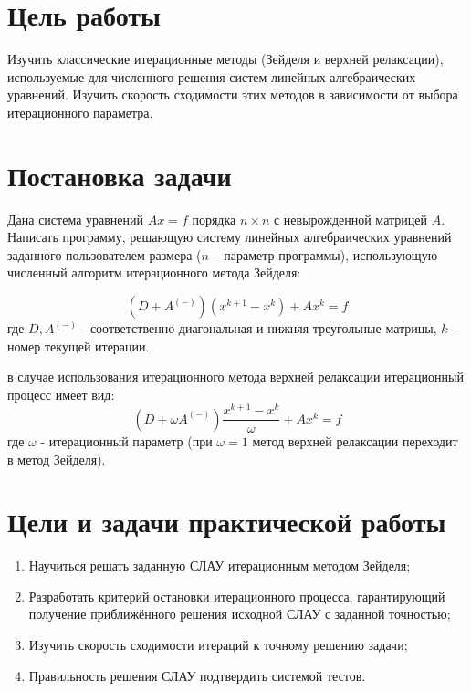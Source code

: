 \newpage
\section{Цель работы}

Изучить классические итерационные методы (Зейделя и верхней релаксации), используемые для численного решения систем линейных алгебраических уравнений.
Изучить скорость сходимости этих методов в зависимости от выбора итерационного параметра.
\par

\section{Постановка задачи}
Дана система уравнений $Ax = f$ порядка $n \times n$ с невырожденной матрицей $A$.
Написать программу, решающую систему линейных алгебраических уравнений заданного пользователем размера
($n$ -- параметр программы), использующую численный алгоритм итерационного метода Зейделя:
\par
\begin{equation*}
    \left(D + A^{(-)}\right)\left(x^{k + 1} - x^k\right) + Ax^k = f
\end{equation*}
где $D, A^{(-)}$ - соответственно диагональная и нижняя треугольные матрицы, $k$ - номер текущей итерации.
\par
в случае использования итерационного метода верхней релаксации итерационный процесс имеет вид:
$$
    \left(D + \omega A^{(-)}\right)\frac{x^{k + 1} - x^k}{\omega} + Ax^k = f
$$
где $\omega$ - итерационный параметр (при $\omega = 1$ метод верхней релаксации переходит в метод Зейделя).

\section{Цели и задачи практической работы}
\begin{enumerate}
    \item Научиться решать заданную СЛАУ итерационным методом Зейделя;
    \item Разработать критерий остановки итерационного процесса, гарантирующий получение приближённого решения исходной СЛАУ с заданной точностью;
    \item Изучить скорость сходимости итераций к точному решению задачи;
    \item Правильность решения СЛАУ подтвердить системой тестов.
\end{enumerate}
